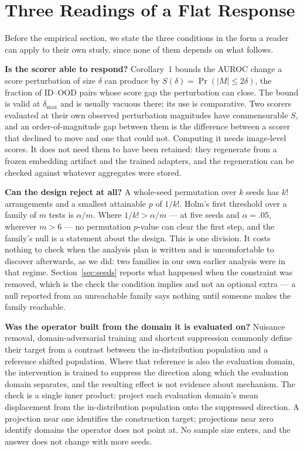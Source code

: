 \documentclass[pdflatex,sn-basic]{sn-jnl}
\theoremstyle{plain}
\theoremstyle{definition}
\theoremstyle{remark}
\begin{document}
\section{Three Readings of a Flat Response}
\label{sec:three}
Before the empirical section, we state the three conditions in the form a
reader can apply to their own study, since none of them depends on what
follows.

\textbf{Is the scorer able to respond?} Corollary~1 bounds the AUROC change a
score perturbation of size $\delta$ can produce by $S(\delta)=\Pr(|M|\le
2\delta)$, the fraction of ID--OOD pairs whose score gap the perturbation can
close. The bound is valid at $\delta_{\max}$ and is usually vacuous there; its
use is comparative. Two scorers evaluated at their own observed perturbation
magnitudes have commensurable $S$, and an order-of-magnitude gap between them
is the difference between a scorer that declined to move and one that could not.
Computing it needs image-level scores. It does not need them to have been
retained: they regenerate from a frozen embedding artifact and the trained
adapters, and the regeneration can be checked against whatever aggregates were
stored.

\textbf{Can the design reject at all?} A whole-seed permutation over $k$ seeds
has $k!$ arrangements and a smallest attainable $p$ of $1/k!$. Holm's first
threshold over a family of $m$ tests is $\alpha/m$. Where $1/k! > \alpha/m$ ---
at five seeds and $\alpha=.05$, wherever $m>6$ --- no permutation $p$-value can
clear the first step, and the family's null is a statement about the design.
This is one division. It costs nothing to check when the analysis plan is
written and is uncomfortable to discover afterwards, as we did: two families in
our own earlier analysis were in that regime. Section~\ref{sec:seeds} reports
what happened when the constraint was removed, which is the check the condition
implies and not an optional extra --- a null reported from an unreachable
family says nothing until someone makes the family reachable.

\textbf{Was the operator built from the domain it is evaluated on?} Nuisance
removal, domain-adversarial training and shortcut suppression commonly define
their target from a contrast between the in-distribution population and a
reference shifted population. Where that reference is also the evaluation
domain, the intervention is trained to suppress the direction along which the
evaluation domain separates, and the resulting effect is not evidence about
mechanism. The check is a single inner product: project each evaluation
domain's mean displacement from the in-distribution population onto the
suppressed direction. A projection near one identifies the construction target;
projections near zero identify domains the operator does not point at. No
sample size enters, and the answer does not change with more seeds.
\end{document}
